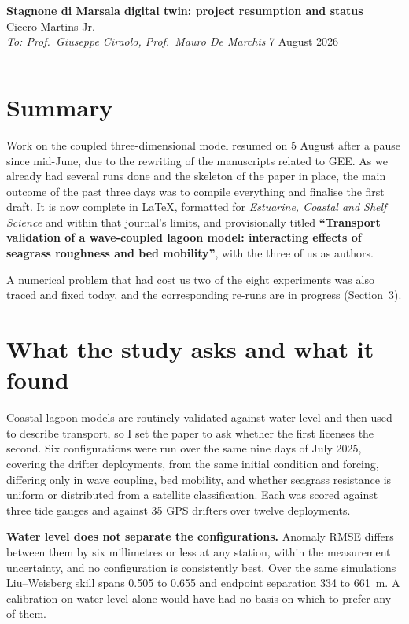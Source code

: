 \documentclass[11pt]{article}
\begin{document}
\thispagestyle{fancy}

\begin{center}
{\large\bfseries Stagnone di Marsala digital twin: project resumption and status}\\[0.3em]
Cicero Martins Jr.\\
\textit{To: Prof.\ Giuseppe Ciraolo, Prof.\ Mauro De Marchis} \hfill 7 August 2026
\end{center}

\vspace{0.2em}
\hrule
\vspace{0.6em}

\section{Summary}

Work on the coupled three-dimensional model resumed on 5 August after a pause
since mid-June, due to the rewriting of the manuscripts related to GEE. As we
already had several runs done and the skeleton of the paper in place, the main
outcome of the past three days was to compile everything and finalise the first
draft. It is now complete in LaTeX, formatted for \textit{Estuarine, Coastal and
Shelf Science} and within that journal's limits, and provisionally titled
\textbf{``Transport validation of a wave-coupled lagoon model: interacting
effects of seagrass roughness and bed mobility''}, with the three of us as
authors.

A numerical problem that had cost us two of the eight experiments was also
traced and fixed today, and the corresponding re-runs are in progress
(Section~3).

\section{What the study asks and what it found}

Coastal lagoon models are routinely validated against water level and then used
to describe transport, so I set the paper to ask whether the first licenses the
second. Six configurations were run over the same nine days of July 2025,
covering the drifter deployments, from the same initial condition and forcing,
differing only in wave coupling, bed mobility, and whether seagrass resistance
is uniform or distributed from a satellite classification. Each was scored
against three tide gauges and against 35 GPS drifters over twelve deployments.

\textbf{Water level does not separate the configurations.} Anomaly RMSE differs
between them by six millimetres or less at any station, within the measurement
uncertainty, and no configuration is consistently best. Over the same
simulations Liu--Weisberg skill spans 0.505 to 0.655 and endpoint separation 334
to 661~m. A calibration on water level alone would have had no basis on which to
prefer any of them.
\end{document}
